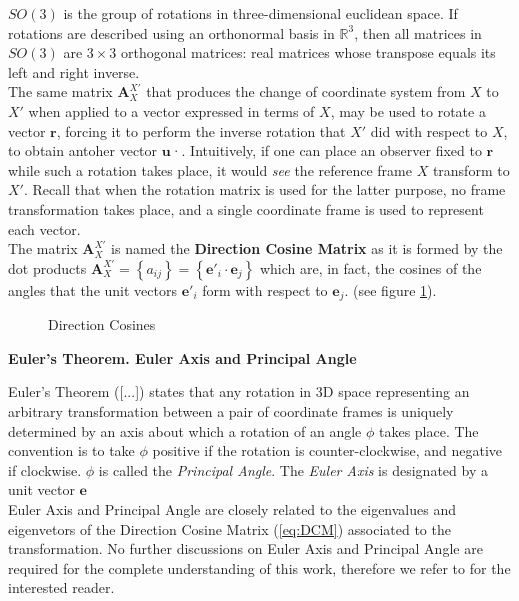  $SO(3)$ is the group of rotations in three-dimensional euclidean space. If rotations are described using an orthonormal basis in $\mathbb{R}^3$, then all matrices in $SO(3)$ are $3\times 3$ orthogonal matrices: real matrices whose transpose equals its left and right inverse.\\

The same matrix $\mathbf{A}_X^{X'}$ that produces the change of coordinate system from $X$ to $X'$ when applied to a vector expressed in terms of $X$, may be used to rotate a vector $\mathbf{r}$, forcing it to perform the inverse rotation that $X'$ did with respect to $X$, to obtain antoher vector $\mathbf{u}$·. Intuitively, if one can place an observer fixed to $\mathbf{r}$ while such a rotation takes place, it would \textit{see} the reference frame $X$ transform to $X'$. Recall that when the rotation matrix is used for the latter purpose, no frame transformation takes place, and a single coordinate frame is used to represent each vector.\\

The matrix $\mathbf{A}_X^{X'}$ is named the \textbf{Direction Cosine Matrix} as it is formed by the dot products $\mathbf{A}_X^{X'} = \left\lbrace a_{ij} \right\rbrace = \left\lbrace \mathbf{e}'_i \cdot \mathbf{e}_j \right\rbrace $ which are, in fact, the cosines of the angles that the unit vectors $\mathbf{e}'_i$ form with respect to $\mathbf{e}_j$. (see figure \ref{fig:frameCosines}).\\
	
\begin{figure}
	\centering
	\caption{Direction Cosines}
	\label{fig:frameCosines}
\end{figure}

{\bf Euler's Theorem. Euler Axis and Principal Angle}

Euler's Theorem ([...]) states that any rotation in 3D space representing an arbitrary transformation between a pair of coordinate frames is uniquely determined by an axis about which a rotation of an angle $\phi$ takes place. The convention is to take $\phi$ positive if the rotation is counter-clockwise, and negative if clockwise. $\phi$ is called the \textit{Principal Angle}. The \textit{Euler  Axis} is designated by a unit vector $\mathbf{e}$ \\

Euler Axis and Principal Angle are closely related to the eigenvalues and eigenvetors of the Direction Cosine Matrix (\ref{eq:DCM}) associated to the transformation. No further discussions on Euler Axis and Principal Angle are required for the complete understanding of this work, therefore we refer to \cite{tewari2007} for the interested reader.\\

